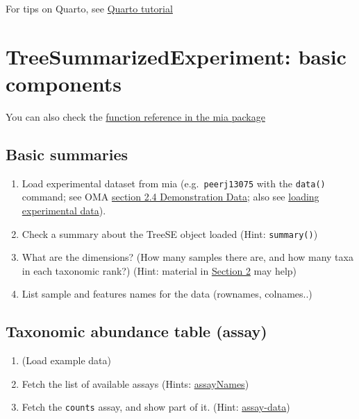 \documentclass[
]{book}
\providecommand{\tightlist}{%
  \setlength{\itemsep}{0pt}\setlength{\parskip}{0pt}}
\begin{document}
For tips on Quarto, see \href{https://quarto.org/docs/authoring/markdown-basics.html}{Quarto tutorial}

\hypertarget{treesummarizedexperiment-basic-components}{%
\section{TreeSummarizedExperiment: basic components}\label{treesummarizedexperiment-basic-components}}

You can also check the \href{https://microbiome.github.io/mia/reference/index.html}{function reference in the mia package}

\hypertarget{basic-summaries}{%
\subsection{Basic summaries}\label{basic-summaries}}

\begin{enumerate}
\def\labelenumi{\arabic{enumi}.}
\tightlist
\item
  Load experimental dataset from mia (e.g.~\texttt{peerj13075} with the \texttt{data()} command; see OMA \href{https://microbiome.github.io/OMA/containers.html\#example-data}{section 2.4 Demonstration Data}; also see \href{https://microbiome.github.io/OMA/containers.html\#assay-data}{loading experimental data}).
\item
  Check a summary about the TreeSE object loaded (Hint: \texttt{summary()})
\item
  What are the dimensions? (How many samples there are, and how many taxa in each taxonomic rank?) (Hint: material in \href{https://microbiome.github.io/OMA/containers.html\#data-science-framework}{Section 2} may help)
\item
  List sample and features names for the data (rownames, colnames..)
\end{enumerate}

\hypertarget{taxonomic-abundance-table-assay}{%
\subsection{Taxonomic abundance table (assay)}\label{taxonomic-abundance-table-assay}}

\begin{enumerate}
\def\labelenumi{\arabic{enumi}.}
\tightlist
\item
  (Load example data)
\item
  Fetch the list of available assays (Hints: \href{https://microbiome.github.io/OMA/containers.html\#assay-data}{assayNames})
\item
  Fetch the \texttt{counts} assay, and show part of it. (Hint: \href{https://microbiome.github.io/OMA/containers.html\#assay-data}{assay-data})
\end{enumerate}
\end{document}

